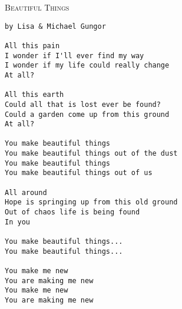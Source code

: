 \documentclass[10pt,oneside,footinclude=true,headinclude=true]{scrbook} %
\newcommand\songtitle[1]{
	\hspace*{-3.7mm}\Large\textsc{#1}
}
\begin{document}
\newpage
\bigskip
\songtitle{Beautiful Things}
\begin{verbatim}
by Lisa & Michael Gungor

All this pain
I wonder if I'll ever find my way
I wonder if my life could really change
At all?

All this earth
Could all that is lost ever be found?
Could a garden come up from this ground
At all?

You make beautiful things
You make beautiful things out of the dust
You make beautiful things
You make beautiful things out of us

All around
Hope is springing up from this old ground
Out of chaos life is being found
In you

You make beautiful things...
You make beautiful things...

You make me new
You are making me new
You make me new
You are making me new

\end{verbatim}
\end{document}
